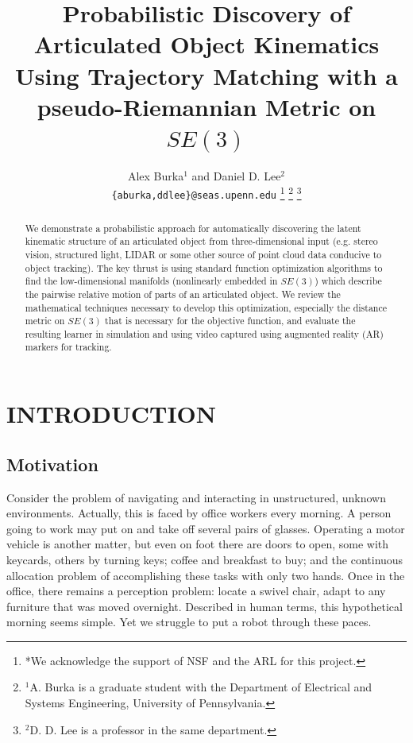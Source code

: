 \documentclass[letterpaper, 10 pt, conference]{ieeeconf}  %
\title{\LARGE \bf
Probabilistic Discovery of Articulated Object Kinematics Using Trajectory Matching with a pseudo-Riemannian Metric on $SE(3)$
}
\author{Alex Burka$^{1}$ and Daniel D. Lee$^{2}$ \\ {\tt\small\{aburka,ddlee\}@seas.upenn.edu}
\thanks{*We acknowledge the support of NSF and the ARL for this project.}%
\thanks{$^{1}$A. Burka is a graduate student with the Department of Electrical and Systems Engineering, University of Pennsylvania.}%
\thanks{$^{2}$D. D. Lee is a professor in the same department.}%
}
\begin{document}
\maketitle
\thispagestyle{empty}
\pagestyle{empty}


\begin{abstract}

  We demonstrate a probabilistic approach for automatically discovering the latent kinematic structure of an articulated object from three-dimensional input (e.g. stereo vision, structured light, LIDAR or some other source of point cloud data conducive to object tracking).  The key thrust is using standard function optimization algorithms to find the low-dimensional manifolds (nonlinearly embedded in $SE(3)$) which describe the pairwise relative motion of parts of an articulated object. We review the mathematical techniques necessary to develop this optimization, especially the distance metric on $SE(3)$ that is necessary for the objective function, and evaluate the resulting learner in simulation and using video captured using augmented reality (AR) markers for tracking.

\end{abstract}


\section{INTRODUCTION}

\subsection{Motivation}
Consider the problem of navigating and interacting in unstructured, unknown environments. Actually, this is faced by office workers every morning. A person going to work may put on and take off several pairs of glasses. Operating a motor vehicle is another matter, but even on foot there are doors to open, some with keycards, others by turning keys; coffee and breakfast to buy; and the continuous allocation problem of accomplishing these tasks with only two hands. Once in the office, there remains a perception problem: locate a swivel chair, adapt to any furniture that was moved overnight. Described in human terms, this hypothetical morning seems simple. Yet we struggle to put a robot through these paces.
\end{document}
